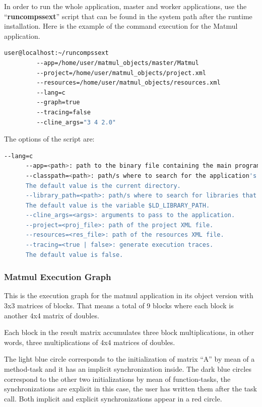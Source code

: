 In order to run the whole application, master and worker applications, use the ``{\bf runcompssext}'' 
script that can be found in the system path after the runtime installation. Here is the example of the 
command execution for the Matmul application.

\begin{lstlisting}[language=bash]
user@localhost:~/runcompssext
         --app=/home/user/matmul_objects/master/Matmul
         --project=/home/user/matmul_objects/project.xml
         --resources=/home/user/matmul_objects/resources.xml
         --lang=c
         --graph=true
         --tracing=false
         --cline_args="3 4 2.0"
\end{lstlisting}

The options of the script are:
\begin{lstlisting}[language=bash]
      --lang=c
      --app=<path>: path to the binary file containing the main program.
      --classpath=<path>: path/s where to search for the application's modules.
      The default value is the current directory.
      --library_path=<path>: path/s where to search for libraries that are not in a standard path.
      The default value is the variable $LD_LIBRARY_PATH.
      --cline_args=<args>: arguments to pass to the application.
      --project=<proj_file>: path of the project XML file.
      --resources=<res_file>: path of the resources XML file.
      --tracing=<true | false>: generate execution traces.
      The default value is false.
\end{lstlisting}

\subsubsection{Matmul Execution Graph}
This is the execution graph for the matmul application in its object version with 3x3 matrices of blocks. 
That means a total of 9 blocks where each block is another 4x4 matrix of doubles.

Each block in the result matrix accumulates three block multiplications, in other words, three multiplications 
of 4x4 matrices of doubles.

The light blue circle corresponds to the initialization of matrix ``A'' by mean of a method-task and it has 
an implicit synchronization inside. The dark blue circles correspond to the other two initializations by 
mean of function-tasks, the synchronizations are explicit in this case, the user has written them after the 
task call. Both implicit and explicit synchronizations appear in a red circle.

